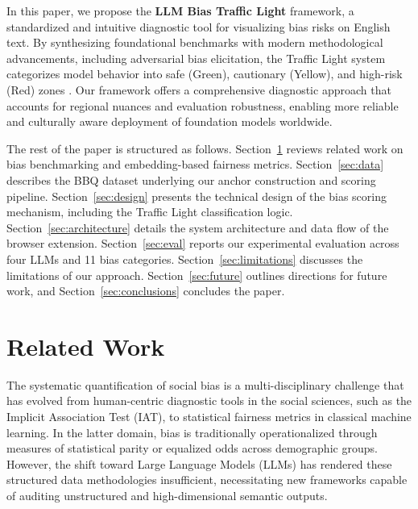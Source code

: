 \documentclass[runningheads]{llncs}
\begin{document}
%

In this paper, we propose the \textbf{LLM Bias Traffic Light} framework, a standardized and intuitive diagnostic tool for visualizing bias risks on English text. By synthesizing foundational benchmarks with modern methodological advancements, including adversarial bias elicitation, the Traffic Light system categorizes model behavior into safe (Green), cautionary (Yellow), and high-risk (Red) zones \cite{cantini2025clear,siska-etal-2024-examining}. Our framework offers a comprehensive diagnostic approach that accounts for regional nuances and evaluation robustness, enabling more reliable and culturally aware deployment of foundation models worldwide.

%

The rest of the paper is structured as follows. Section~\ref{sec:related} reviews related work on bias benchmarking and embedding-based fairness metrics. Section~\ref{sec:data} describes the BBQ dataset underlying our anchor construction and scoring pipeline. Section~\ref{sec:design} presents the technical design of the bias scoring mechanism, including the Traffic Light classification logic. Section~\ref{sec:architecture} details the system architecture and data flow of the browser extension. Section~\ref{sec:eval} reports our experimental evaluation across four LLMs and 11 bias categories. Section~\ref{sec:limitations} discusses the limitations of our approach. Section~\ref{sec:future} outlines directions for future work, and Section~\ref{sec:conclusions} concludes the paper.


\section{Related Work}
\label{sec:related}

The systematic quantification of social bias is a multi-disciplinary challenge that has evolved from human-centric diagnostic tools in the social sciences, such as the Implicit Association Test (IAT), to statistical fairness metrics in classical machine learning. In the latter domain, bias is traditionally operationalized through measures of statistical parity or equalized odds across demographic groups. However, the shift toward Large Language Models (LLMs) has rendered these structured data methodologies insufficient, necessitating new frameworks capable of auditing unstructured and high-dimensional semantic outputs.

%
\end{document}
